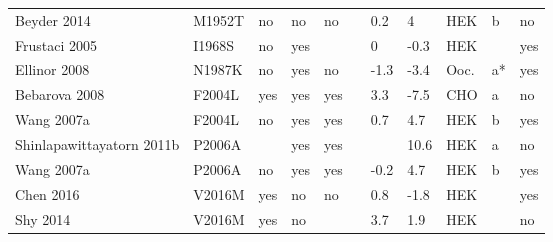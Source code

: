 \begin{tiny}
\begin{longtable}{p{4cm}|l|llll|ll|lll}
Beyder 2014\cite{Beyder2014MutationDB} & M1952T & no & no & no &  & 0.2 & 4 & HEK & b & no \\
Frustaci 2005\cite{Frustaci2005MutationDB} & I1968S & no & yes &  &  & 0 & -0.3 & HEK &  & yes \\
Ellinor 2008\cite{Ellinor2008MutationDB} & N1987K & no & yes & no &  & -1.3 & -3.4 & Ooc. & a* & yes \\
Bebarova 2008\cite{Bebarova2008MutationDB} & F2004L & yes & yes & yes &  & 3.3 & -7.5 & CHO & a & no \\
Wang 2007a\cite{Wang2007aMutationDB} & F2004L & no & yes & yes &  & 0.7 & 4.7 & HEK & b & yes \\
Shinlapawittayatorn 2011b\cite{Shinlapawittayatorn2011bMutationDB} & P2006A &  & yes & yes &  &  & 10.6 & HEK & a & no \\
Wang 2007a\cite{Wang2007aMutationDB} & P2006A & no & yes & yes &  & -0.2 & 4.7 & HEK & b & yes \\
Chen 2016\cite{Chen2016MutationDB} & V2016M & yes & no & no &  & 0.8 & -1.8 & HEK &  & yes \\
Shy 2014\cite{Shy2014MutationDB} & V2016M & yes & no &  &  & 3.7 & 1.9 & HEK &  & no \\
\end{longtable}
\end{tiny}
